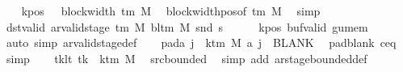 \begin{isabellebody}
\isanewline
\ \ \isamarkupfalse%
\ kpos{\isacharcolon}{\kern0pt}\ {\isachardoublequoteopen}{}\ {\isacharless}{\kern0pt}\ block{\isacharunderscore}{\kern0pt}width\ {\isacharparenleft}{\kern0pt}{\isasymGamma}{\isacharunderscore}{\kern0pt}tm\ M{\isacharparenright}{\kern0pt}{\isachardoublequoteclose}\ \isamarkupfalse%
\ block{\isacharunderscore}{\kern0pt}width{\isacharunderscore}{\kern0pt}pos{\isacharbrackleft}{\kern0pt}of\ {\isachardoublequoteopen}{\isasymGamma}{\isacharunderscore}{\kern0pt}tm\ M{\isachardoublequoteclose}{\isacharbrackright}{\kern0pt}\ \isamarkupfalse%
\ simp\isanewline
\ \ \isamarkupfalse%
\ dst{\isacharunderscore}{\kern0pt}valid{\isacharcolon}{\kern0pt}\ {\isachardoublequoteopen}ar{\isacharunderscore}{\kern0pt}valid{\isacharunderscore}{\kern0pt}stage\ {\isacharparenleft}{\kern0pt}{\isasymGamma}{\isacharunderscore}{\kern0pt}tm\ M{\isacharparenright}{\kern0pt}\ {\isacharparenleft}{\kern0pt}bl{\isacharunderscore}{\kern0pt}tm\ M{\isacharparenright}{\kern0pt}\ {\isacharparenleft}{\kern0pt}snd\ {\isacharquery}{\kern0pt}s{\isacharprime}{\kern0pt}{\isacharparenright}{\kern0pt}{\isachardoublequoteclose}\isanewline
\ \ \ \ \isamarkupfalse%
\ kpos\ buf{\isacharunderscore}{\kern0pt}valid\ gu{\isacharunderscore}{\kern0pt}mem\ \isamarkupfalse%
\ {\isacharparenleft}{\kern0pt}auto\ simp{\isacharcolon}{\kern0pt}\ ar{\isacharunderscore}{\kern0pt}valid{\isacharunderscore}{\kern0pt}stage{\isacharunderscore}{\kern0pt}def{\isacharparenright}{\kern0pt}\isanewline
\ \ \isamarkupfalse%
\ pad{\isacharunderscore}{\kern0pt}a{\isacharcolon}{\kern0pt}\ {\isachardoublequoteopen}{\isasymforall}j\ {\isasymge}\ k{\isacharunderscore}{\kern0pt}tm\ M{\isachardot}{\kern0pt}\ {\isacharquery}{\kern0pt}a\ j\ {\isacharequal}{\kern0pt}\ BLANK{}{\isachardoublequoteclose}\ \isamarkupfalse%
\ pad{\isacharunderscore}{\kern0pt}blank\ c{\isacharprime}{\kern0pt}{\isacharunderscore}{\kern0pt}eq\ \isamarkupfalse%
\ simp\isanewline
\ \ \isamarkupfalse%
\ tk{\isacharunderscore}{\kern0pt}lt{\isacharcolon}{\kern0pt}\ {\isachardoublequoteopen}tk\ {\isacharless}{\kern0pt}\ k{\isacharunderscore}{\kern0pt}tm\ M{\isachardoublequoteclose}\ \isamarkupfalse%
\ src{\isacharunderscore}{\kern0pt}bounded\ \isamarkupfalse%
\ {\isacharparenleft}{\kern0pt}simp\ add{\isacharcolon}{\kern0pt}\ ar{\isacharunderscore}{\kern0pt}stage{\isacharunderscore}{\kern0pt}bounded{\isacharunderscore}{\kern0pt}def{\isacharparenright}{\kern0pt}\isanewline

\end{isabellebody}

